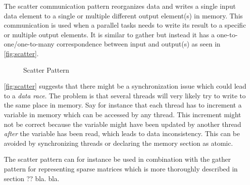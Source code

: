 The scatter communication pattern reorganizes data and writes a single input data element to a single or multiple different output element(s) in memory.
This communication is used when a parallel tasks needs to write its result to a specific or multiple output elements.
It is similar to gather but instead it has a one-to-one/one-to-many correspondence between input and output(s) as seen in \autoref{fig:scatter}.
\begin{figure}[ht]
	\centering
	\caption{Scatter Pattern}
	\label{fig:scatter}
\end{figure}
\autoref{fig:scatter} suggests that there might be a synchronization issue which could lead to a \textit{data race}.
The problem is that several threads will very likely try to write to the same place in memory.
Say for instance that each thread has to increment a variable in memory which can be accessed by any thread.
This increment might not be correct because the variable might have been updated by another thread \textit{after} the variable has been read, which leads to data inconsistency.
This can be avoided by synchronizing threads or declaring the memory section as atomic.

The scatter pattern can for instance be used in combination with the gather pattern for representing sparse matrices which is more thoroughly described in section ?? bla. bla.
